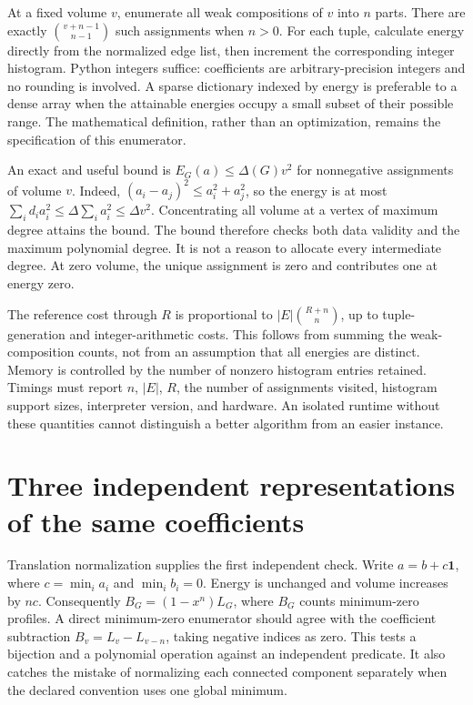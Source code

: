 \documentclass[
  11pt,
  a4paper,
]{report}
\begin{document}
At a fixed volume \(v\), enumerate all weak compositions of \(v\) into
\(n\) parts. There are exactly \(\binom{v+n-1}{n-1}\) such assignments
when \(n>0\). For each tuple, calculate energy directly from the
normalized edge list, then increment the corresponding integer
histogram. Python integers suffice: coefficients are arbitrary-precision
integers and no rounding is involved. A sparse dictionary indexed by
energy is preferable to a dense array when the attainable energies
occupy a small subset of their possible range. The mathematical
definition, rather than an optimization, remains the specification of
this enumerator.

An exact and useful bound is \(E_G(a)\le\Delta(G)v^2\) for nonnegative
assignments of volume \(v\). Indeed, \((a_i-a_j)^2\le a_i^2+a_j^2\), so
the energy is at most
\(\sum_i d_i a_i^2\le\Delta\sum_i a_i^2\le\Delta v^2\). Concentrating
all volume at a vertex of maximum degree attains the bound. The bound
therefore checks both data validity and the maximum polynomial degree.
It is not a reason to allocate every intermediate degree. At zero
volume, the unique assignment is zero and contributes one at energy
zero.

The reference cost through \(R\) is proportional to
\(|E|\binom{R+n}{n}\), up to tuple-generation and integer-arithmetic
costs. This follows from summing the weak-composition counts, not from
an assumption that all energies are distinct. Memory is controlled by
the number of nonzero histogram entries retained. Timings must report
\(n\), \(|E|\), \(R\), the number of assignments visited, histogram
support sizes, interpreter version, and hardware. An isolated runtime
without these quantities cannot distinguish a better algorithm from an
easier instance.

\hypertarget{three-independent-representations-of-the-same-coefficients}{%
\section{Three independent representations of the same
coefficients}\label{three-independent-representations-of-the-same-coefficients}}

Translation normalization supplies the first independent check. Write
\(a=b+c\mathbf1\), where \(c=\min_i a_i\) and \(\min_i b_i=0\). Energy
is unchanged and volume increases by \(nc\). Consequently
\(B_G=(1-x^n)L_G\), where \(B_G\) counts minimum-zero profiles. A direct
minimum-zero enumerator should agree with the coefficient subtraction
\(B_v=L_v-L_{v-n}\), taking negative indices as zero. This tests a
bijection and a polynomial operation against an independent predicate.
It also catches the mistake of normalizing each connected component
separately when the declared convention uses one global minimum.
\end{document}
